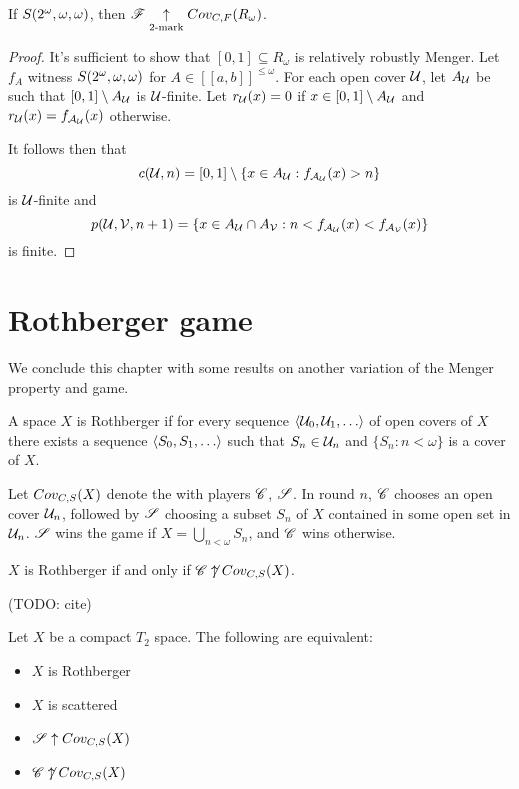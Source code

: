 \begin{thm}
  If $S(2^\omega,\omega,\omega)$, then $\mathscr{F}\underset{2\text{-mark}}{\uparrow}Cov_{C,F}(R_\omega)$.
\end{thm}

\begin{proof}
  It's sufficient to show that $[0,1]\subseteq R_\omega$ is relatively
  robustly Menger. Let $f_A$ witness $S(2^\omega,\omega,\omega)$
  for $A\in[[a,b]]^{\leq\omega}$.
  For each open cover $\mathcal{U}$, let $A_{\mathcal{U}}$ be
  such that $[0,1]\setminus A_{\mathcal{U}}$ is $\mathcal{U}$-finite.
  Let $r_{\mathcal{U}}(x)=0$ if $x\in[0,1]\setminus A_{\mathcal{U}}$ and
  $r_{\mathcal{U}}(x)=f_{\mathcal{A}_{\mathcal{U}}}(x)$ otherwise.

  It follows then that
    \[
      c(\mathcal{U},n) = [0,1]\setminus\{x\in A_{\mathcal{U}}:f_{\mathcal{A}_{\mathcal{U}}}(x)>n\}
    \]
  is $\mathcal{U}$-finite and
    \[
      p(\mathcal{U},\mathcal{V},n+1)
        =
      \{x\in A_{\mathcal{U}}\cap A_{\mathcal{V}}
        :
      n<f_{\mathcal{A}_{\mathcal{U}}}(x)<f_{\mathcal{A}_{\mathcal{V}}}(x)\}
    \]
  is finite.
\end{proof}


\section{Rothberger game}

We conclude this chapter with some results on another variation of the
Menger property and game.

\begin{defn}
  A space $X$ is Rothberger if for every sequence $\<\mc U_0,\mc U_1,\dots\>$
  of open covers of $X$ there exists a sequence
  $\<S_0,S_1,\dots\>$ such that $S_n\in\mathcal{U}_n$
  and $\{S_n:n<\omega\}$ is a cover of $X$.
\end{defn}

\begin{game}
  Let $Cov_{C,S}(X)$ denote the  with players $\mathscr{C}$,
  $\mathscr{S}$.
  In round $n$, $\mathscr{C}$ chooses an open cover $\mathcal{U}_n$, followed by $\mathscr{S}$
  choosing a subset $S_n$ of $X$ contained in some open set in $\mathcal{U}_n$.
  $\mathscr{S}$ wins the game if $X = \bigcup_{n<\omega}S_n$,
  and $\mathscr{C}$ wins otherwise.
\end{game}

\begin{thm}
  $X$ is Rothberger if and only if $\mathscr{C}\not\uparrow Cov_{C,S}(X)$.
  \cite{MR1279482}
\end{thm}

(TODO: cite)

\begin{thm}
  Let $X$ be a compact $T_2$ space. The following are equivalent:
    \begin{itemize}
      \item $X$ is Rothberger
      \item $X$ is scattered
      \item $\mathscr{S}\uparrow Cov_{C,S}(X)$
      \item $\mathscr{C}\not\uparrow Cov_{C,S}(X)$
    \end{itemize}
\end{thm}

